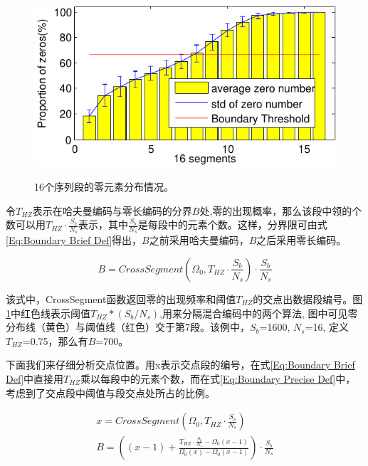 \begin{figure}
  \centering
  \includegraphics{Pictures/Compression/f6-crop.pdf}\\
  \caption{16个序列段的零元素分布情况。}\label{fig:Zero Distribution}
\end{figure}

令$T_{HZ}$表示在哈夫曼编码与零长编码的分界$B$处,零的出现概率，那么该段中领的个数可以用$T_{HZ}\cdot \frac{S_b}{N_s}$表示，其中$\frac{S_b}{N_s}$是每段中的元素个数。这样，分界限可由式\ref{Eq:Boundary Brief Def}得出，$B$之前采用哈夫曼编码，$B$之后采用零长编码。

\begin{equation}\label{Eq:Boundary Brief Def}
  B=CrossSegment\left(\Omega_0,T_{HZ}\cdot\frac{S_b}{N_s}\right)\cdot\frac{S_b}{N_s}
\end{equation}

该式中，CrossSegment函数返回零的出现频率和阈值$T_{HZ}$的交点出数据段编号。图\ref{fig:Zero Distribution}中红色线表示阈值$T_{HZ}*(S_b/N_s)$,用来分隔混合编码中的两个算法, 图中可见零分布线（黄色）与阈值线（红色）交于第7段。该例中，$S_b$=1600, $N_s$=16, 定义 $T_{HZ}$=0.75，那么有$B$=700。


下面我们来仔细分析交点位置。用x表示交点段的编号，在式\ref{Eq:Boundary Brief Def}中直接用$T_{HZ}$乘以每段中的元素个数，而在式\ref{Eq:Boundary Precise Def}中，考虑到了交点段中阈值与段交点处所占的比例。


\begin{equation}\label{Eq:Boundary Precise Def}
  \begin{array}{lr}
    x=CrossSegment\left(\Omega_0,T_{HZ}\cdot\frac{S_b}{N_s}\right)\\
    B=\left((x-1)+\frac{T_{HZ}\cdot \frac{S_b}{N_s}-\Omega_0(x-1)}{\Omega_0(x)-\Omega_0(x-1)}\right)\cdot \frac{S_b}{N_s}
  \end{array}
\end{equation}


